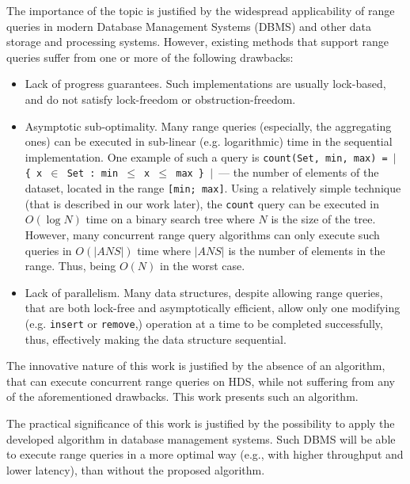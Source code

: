\documentclass[times, dvipsnames,%
               languages={russian,english} %
              ]{itmo-student-thesis}
\begin{document}
The importance of the topic is justified by the widespread applicability of range queries in modern Database Management Systems (DBMS) and other data storage and processing systems. However, existing methods that support range queries suffer from one or more of the following drawbacks:
\begin{itemize}
    \item Lack of progress guarantees. Such implementations are usually lock-based, and do not satisfy lock-freedom or obstruction-freedom.
    
    \item Asymptotic sub-optimality. Many range queries (especially, the aggregating ones) can be executed in sub-linear (e.g. logarithmic) time in the sequential implementation. One example of such a query is \texttt{count(Set, min, max) = $\vert$ \{ x $\in$ Set : min $\leq$ x $\leq$ max \} $\vert$}~--- the number of elements of the dataset, located in the range \texttt{[min; max]}. Using a relatively simple technique (that is described in our work later), the \texttt{count} query can be executed in $O(\log N)$ time on a binary search tree where $N$ is the size of the tree. However, many concurrent range query algorithms can only execute such queries in $O(|ANS|)$ time where $|ANS|$ is the number of elements in the range. Thus, being $O(N)$ in the worst case.
    
    \item Lack of parallelism. Many data structures, despite allowing range queries, that are both lock-free and asymptotically efficient, allow only one modifying (e.g. \texttt{insert} or \texttt{remove},) operation at a time to be completed successfully, thus, effectively making the data structure sequential. 
\end{itemize}

\bigbreak

The innovative nature of this work is justified by the absence of an algorithm, that can execute concurrent range queries on HDS, while not suffering from any of the aforementioned drawbacks. This work presents such an algorithm.

\bigbreak

The practical significance of this work is justified by the possibility to apply the developed algorithm in database management systems. Such DBMS will be able to execute range queries in a more optimal way (e.g., with higher throughput and lower latency), than without the proposed algorithm.

\bigbreak
\end{document}
